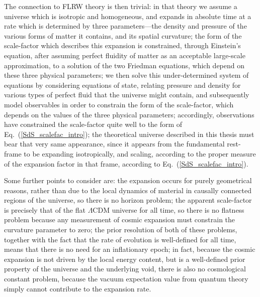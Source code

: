 The connection to FLRW theory is then trivial: in that theory we assume a universe which is isotropic and homogeneous, and expands in absolute time at a rate which is determined by three parameters---the density and pressure of the various forms of matter it contains, and its spatial curvature; the form of the scale-factor which describes this expansion is constrained, through Einstein's equation, after assuming perfect fluidity of matter as an acceptable large-scale approximation, to a solution of the two Friedman equations, which depend on these three physical parameters; we then solve this under-determined system of equations by considering equations of state, relating pressure and density for various types of perfect fluid that the universe might contain, and subsequently model observables in order to constrain the form of the scale-factor, which depends on the values of the three physical parameters; accordingly, observations have constrained the scale-factor quite well to the form of Eq.~(\ref{SdS_scalefac_intro}); the theoretical universe described in this thesis must bear that very same appearance, since it appears from the fundamental rest-frame to be expanding isotropically, and scaling, according to the proper measure of the expansion factor in that frame, according to Eq.~(\ref{SdS_scalefac_intro}).

Some further points to consider are: the expansion occurs for purely geometrical reasons, rather than due to the local dynamics of material in causally connected regions of the universe, so there is no horizon problem; the apparent scale-factor is precisely that of the flat $\Lambda$CDM universe for all time, so there is no flatness problem because any measurement of cosmic expansion must constrain the curvature parameter to zero; the prior resolution of both of these problems, together with the fact that the rate of evolution is well-defined for all time, means that there is no need for an inflationary epoch; in fact, because the cosmic expansion is not driven by the local energy content, but is a well-defined prior property of the universe and the underlying void, there is also no cosmological constant problem, because the vacuum expectation value from quantum theory simply cannot contribute to the expansion rate.

